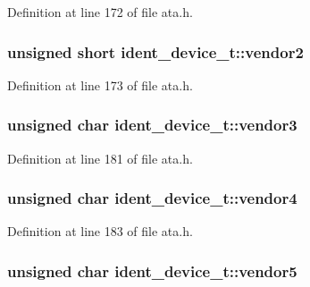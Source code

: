 Definition at line 172 of file ata.\+h.

\subsubsection[{\texorpdfstring{vendor2}{vendor2}}]{\setlength{\rightskip}{0pt plus 5cm}unsigned short ident\+\_\+device\+\_\+t\+::vendor2}\hypertarget{structident__device__t_a9d34132aa72f1591baa59ce870e626e1}{}\label{structident__device__t_a9d34132aa72f1591baa59ce870e626e1}


Definition at line 173 of file ata.\+h.

\subsubsection[{\texorpdfstring{vendor3}{vendor3}}]{\setlength{\rightskip}{0pt plus 5cm}unsigned char ident\+\_\+device\+\_\+t\+::vendor3}\hypertarget{structident__device__t_a3812ae5e744328c081f25c0f4ecaec63}{}\label{structident__device__t_a3812ae5e744328c081f25c0f4ecaec63}


Definition at line 181 of file ata.\+h.

\subsubsection[{\texorpdfstring{vendor4}{vendor4}}]{\setlength{\rightskip}{0pt plus 5cm}unsigned char ident\+\_\+device\+\_\+t\+::vendor4}\hypertarget{structident__device__t_a1484d43f0a155e4fb3efa6d00eadc0d1}{}\label{structident__device__t_a1484d43f0a155e4fb3efa6d00eadc0d1}


Definition at line 183 of file ata.\+h.

\subsubsection[{\texorpdfstring{vendor5}{vendor5}}]{\setlength{\rightskip}{0pt plus 5cm}unsigned char ident\+\_\+device\+\_\+t\+::vendor5}\hypertarget{structident__device__t_aa37d90e0a3dbaf28b2b20ee7a792ca37}{}\label{structident__device__t_aa37d90e0a3dbaf28b2b20ee7a792ca37}


